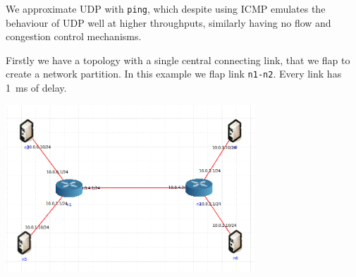 \documentclass[10pt,twoside,a4paper]{article}
\begin{document}
We approximate UDP with \texttt{ping}, which despite using ICMP emulates the behaviour of UDP well at higher throughputs, similarly having no flow and congestion control mechanisms.

Firstly we have a topology with a single central connecting link, that we flap to create a network partition. In this example we flap link \texttt{n1-n2}. Every link has \SI{1}{\ms} of delay.

\begin{minipage}{1\textwidth} \centering
	\includegraphics[width=0.7\textwidth]{delay_partition_topology}
	\label{fig:partition_topology}
\end{minipage}
\end{document}
